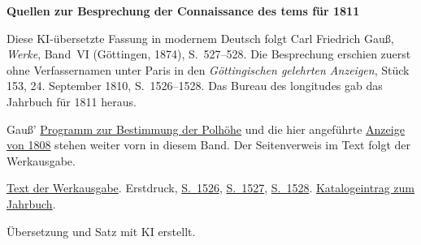 \clearpage\thispagestyle{empty}
\begin{center}\textbf{Quellen zur Besprechung der Connaissance des tems für 1811}\end{center}
\noindent Diese KI-übersetzte Fassung in modernem Deutsch folgt Carl Friedrich Gauß, \textit{Werke}, Band~VI (Göttingen, 1874), S.~527--528. Die Besprechung erschien zuerst ohne Verfassernamen unter Paris in den \textit{Göttingischen gelehrten Anzeigen}, Stück 153, 24. September 1810, S.~1526--1528. Das Bureau des longitudes gab das Jahrbuch für 1811 heraus.
\par\smallskip\noindent Gauß’ \hyperlink{native-44}{Programm zur Bestimmung der Polhöhe} und die hier angeführte \hyperlink{native-73}{Anzeige von 1808} stehen weiter vorn in diesem Band. Der Seitenverweis im Text folgt der Werkausgabe.
\par\smallskip\noindent \href{https://gdz.sub.uni-goettingen.de/id/PPN236007467}{Text der Werkausgabe}. Erstdruck, \href{https://images.p.sub.uni-goettingen.de/iiif/image/gdz:PPN319721507_1810:00001560/full/1650,/0/default.jpg}{S.~1526}, \href{https://images.p.sub.uni-goettingen.de/iiif/image/gdz:PPN319721507_1810:00001561/full/1650,/0/default.jpg}{S.~1527}, \href{https://images.p.sub.uni-goettingen.de/iiif/image/gdz:PPN319721507_1810:00001562/full/1650,/0/default.jpg}{S.~1528}. \href{https://cdt.imcce.fr/items/show/160}{Katalogeintrag zum Jahrbuch}.
\par\smallskip\noindent Übersetzung und Satz mit KI erstellt.
\clearpage
